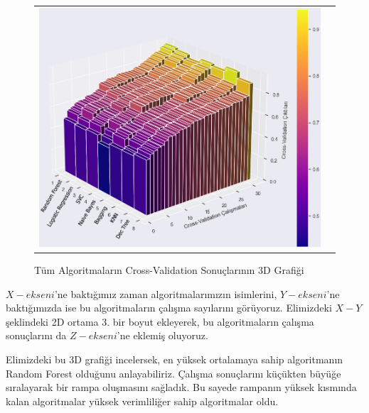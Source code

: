 \documentclass[conference]{IEEEtran}
\begin{document}
\begin{figure}[!h]
	\centering
	\begin{center}
		\begin{tabular}{cc}
			\includegraphics[scale=0.375]{pictures/pic_24.png}&
		\end{tabular}
	\end{center}
	\caption{Tüm Algoritmaların Cross-Validation Sonuçlarının 3D Grafiği}
	\label{fig:24}
\end{figure}

\quad $X-ekseni$'ne baktığımız zaman algoritmalarımızın isimlerini, $Y-ekseni$'ne baktığımızda ise bu algoritmaların çalışma sayılarını görüyoruz. Elimizdeki $X-Y$ şeklindeki 2D ortama 3. bir boyut ekleyerek, bu algoritmaların çalışma sonuçlarını da $Z-ekseni$'ne eklemiş oluyoruz.

\quad Elimizdeki bu 3D grafiği incelersek, en yüksek ortalamaya sahip algoritmanın Random Forest olduğunu anlayabiliriz. Çalışma sonuçlarını küçükten büyüğe sıralayarak bir rampa oluşmasını sağladık. Bu sayede rampanın yüksek kısmında kalan algoritmalar yüksek verimliliğer sahip algoritmalar oldu.

\end{document}
